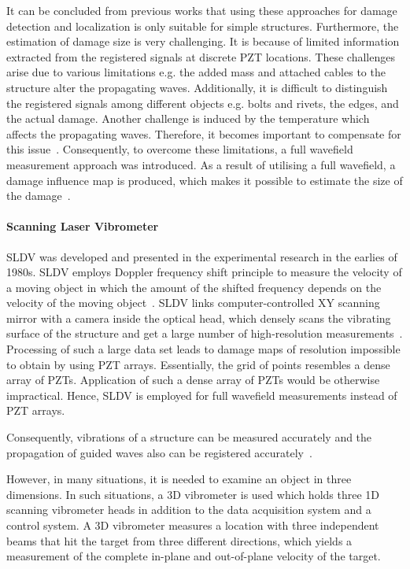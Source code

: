 It can be concluded from previous works that using these approaches for damage detection and localization is only suitable for simple structures. 
Furthermore, the estimation of damage size is very challenging.
It is because of limited information extracted from the registered signals at discrete PZT locations. 
These challenges arise due to various limitations e.g. the added mass and attached cables to the structure alter the propagating waves. 
Additionally, it is difficult to distinguish the registered signals among different objects e.g. bolts and rivets, the edges, and the actual damage. Another challenge is induced by the temperature which affects the propagating waves.
Therefore, it becomes important to compensate for this issue~\cite{Marzani1999}.
Consequently, to overcome these limitations, a full wavefield measurement approach was introduced. 
As a result of utilising a full wavefield, a damage influence map is produced, which makes it possible to estimate the size of the damage~\cite{Ostachowicz2014}.


\paragraph{Scanning Laser   Vibrometer}


SLDV was developed and presented in the experimental research in the earlies of 1980s. 
SLDV employs Doppler frequency shift principle to measure the velocity of a moving object in which the amount of the shifted frequency depends on the velocity of the moving object~\cite{Stanbridge1999}. 
SLDV links computer-controlled XY scanning mirror with a camera inside the optical head, which densely scans the vibrating surface of the structure and get a large number of high-resolution measurements~\cite{Helfrick2011}. 
Processing of such a large data set leads to damage maps of resolution impossible to obtain by using PZT arrays.
Essentially, the grid of points resembles a dense array of PZTs. 
Application of such a dense array of PZTs would be otherwise impractical.  
Hence, SLDV is employed for full wavefield measurements instead of PZT arrays. 

Consequently, vibrations of a structure can be measured accurately and the propagation of guided waves also can be registered accurately~\cite{Ostachowicz2014}.

However, in many situations, it is needed to examine an object in three dimensions. 
In such situations, a 3D vibrometer is used which holds three 1D scanning vibrometer heads in addition to the data acquisition system and a control system.
A 3D vibrometer measures a location with three independent beams that hit the target from three different directions, which yields a measurement of the complete in-plane and out-of-plane velocity of the target.

